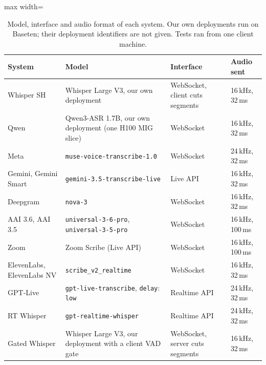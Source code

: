 \documentclass[11pt]{article}
\begin{document}
\begin{table}[!htbp]
\centering\small
\begin{adjustbox}{max width=\textwidth}
\begin{tabular}{@{}llll@{}}
\toprule
System & Model & Interface & Audio sent \\
\midrule
Whisper SH & Whisper Large V3, our own deployment & WebSocket, client cuts segments & 16\,kHz, 32\,ms \\
Qwen & Qwen3-ASR 1.7B, our own deployment (one H100 MIG slice) & WebSocket & 16\,kHz, 32\,ms \\
Meta & \texttt{muse-voice-transcribe-1.0} & WebSocket & 24\,kHz, 32\,ms \\
Gemini, Gemini Smart & \texttt{gemini-3.5-transcribe-live} & Live API & 16\,kHz, 32\,ms \\
Deepgram & \texttt{nova-3} & WebSocket & 16\,kHz, 32\,ms \\
AAI 3.6, AAI 3.5 & \texttt{universal-3-6-pro}, \texttt{universal-3-5-pro} & WebSocket & 16\,kHz, 100\,ms \\
Zoom & Zoom Scribe (Live API) & WebSocket & 16\,kHz, 100\,ms \\
ElevenLabs, ElevenLabs NV & \texttt{scribe\_v2\_realtime} & WebSocket & 16\,kHz, 32\,ms \\
GPT-Live & \texttt{gpt-live-transcribe}, \texttt{delay}: \texttt{low} & Realtime API & 24\,kHz, 32\,ms \\
RT Whisper & \texttt{gpt-realtime-whisper} & Realtime API & 24\,kHz, 32\,ms \\
Gated Whisper & Whisper Large V3, our deployment with a client VAD gate & WebSocket, server cuts segments & 16\,kHz, 32\,ms \\
\bottomrule
\end{tabular}
\end{adjustbox}
\caption{Model, interface and audio format of each system. Our own deployments run on Baseten; their deployment identifiers are not given. Tests ran from one client machine.}
\label{tab:systems}
\end{table}
\end{document}

